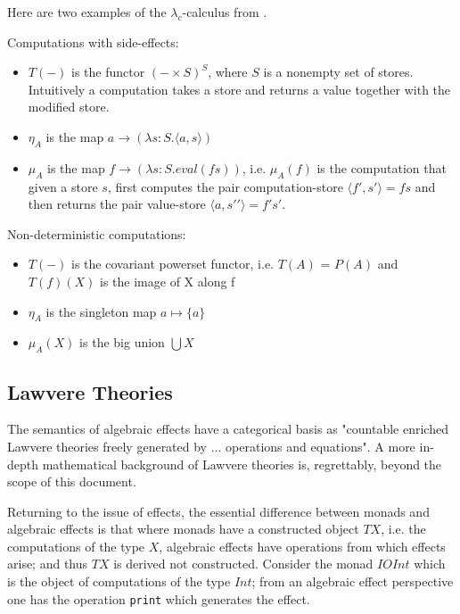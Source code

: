 Here are two examples of the $\lambda_c$-calculus from
\cite{moggi1989computational}\cite{moggi1991notions}.
\vspace{5mm}

\begin{example}\label{lc1}
\end{example}
    Computations with side-effects:
    \begin{itemize}
        \item $T(-)$ is the functor $(-\times S)^S$, where $S$ is a nonempty set of stores.
            Intuitively a computation takes a store and returns a value together with the modified store.
        \item $\eta_A$ is the map $a \rightarrow (\lambda s:S.\langle a,s \rangle)$
        \item $\mu_A$ is the map $f \rightarrow (\lambda s:S.eval(fs))$,
            i.e. $\mu_A(f)$ is the computation that given a store $s$,
            first computes the pair computation-store $\langle f\prime,s\prime\rangle = fs$
            and then returns the pair value-store $\langle a,s\prime\prime\rangle = f\prime s\prime$.
    \end{itemize}
\vspace{5mm}

\begin{example}
    Non-deterministic computations:
    \begin{itemize}
        \item $T(-)$ is the covariant powerset functor,
            i.e.  $T(A)$ = $P(A)$ and $T(f)(X)$ is the image of X along f
        \item $\eta_A$ is the singleton map $a \mapsto  \{a\}$
        \item $\mu_A(X)$ is the big union $\bigcup X$
    \end{itemize}
\end{example}

\subsection{Lawvere Theories}
The semantics of algebraic effects have a categorical basis as
"countable enriched Lawvere theories freely generated by $\dots$ operations and equations".
\cite{plotkin2004computational}
A more in-depth mathematical background of Lawvere theories is,
regrettably, beyond the scope of this document.

Returning to the issue of effects,
the essential difference between monads and algebraic effects is that
where monads have a constructed object $TX$,
i.e. the computations of the type $X$,
algebraic effects have operations from which effects arise;
and thus $TX$ is derived not constructed.
Consider the monad $IO Int$ which is the object of computations
of the type $Int$;
from an algebraic effect perspective
one has the operation \texttt{print} which generates the effect.\\

